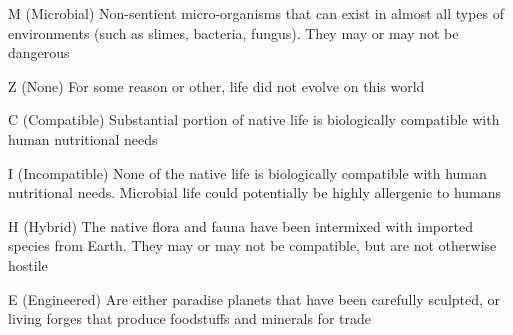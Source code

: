 \begin{genericsection}{M (Microbial)}
  Non-sentient micro-organisms that can exist in almost all types of environments (such as slimes, bacteria, fungus). They may or may not be dangerous
\end{genericsection}

\begin{genericsection}{Z (None)}
  For some reason or other, life did not evolve on this world
\end{genericsection}

\begin{genericsection}{C (Compatible)}
  Substantial portion of native life is biologically compatible with human nutritional needs
\end{genericsection}

\begin{genericsection}{I (Incompatible)}
  None of the native life is biologically compatible with human nutritional needs. Microbial life could potentially be highly allergenic to humans
\end{genericsection}

\begin{genericsection}{H (Hybrid)}
  The native flora and fauna have been intermixed with imported species from Earth. They may or may not be compatible, but are not otherwise hostile
\end{genericsection}

\begin{genericsection}{E (Engineered)}
  Are either paradise planets that have been carefully sculpted, or living forges that produce foodstuffs and minerals for trade
\end{genericsection}
